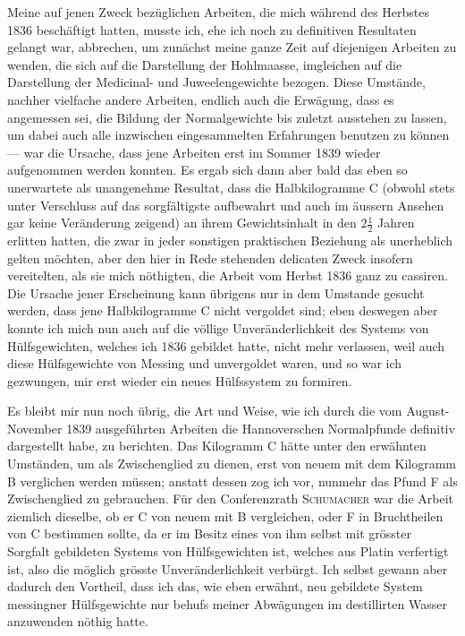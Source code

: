 Meine auf jenen Zweck bezüglichen Arbeiten, die mich während des
Herbstes 1836 beschäftigt hatten, musste ich, ehe ich noch zu definitiven
Resultaten gelangt war, abbrechen, um zunächst meine ganze Zeit auf diejenigen
Arbeiten zu wenden, die sich auf die Darstellung der Hohlmaasse,
imgleichen auf die Darstellung der Medicinal- und Juweelengewichte bezogen.
Diese Umstände, nachher vielfache andere Arbeiten, endlich auch die Erwägung,
dass es angemessen sei, die Bildung der Normalgewichte bis zuletzt
ausstehen zu lassen, um dabei auch alle inzwischen eingesammelten Erfahrungen
benutzen zu können — war die Ursache, dass jene Arbeiten erst im Sommer
1839 wieder aufgenommen werden konnten. Es ergab sich dann aber bald
\clearpage{}
\noindent das eben so unerwartete als unangenehme Resultat, dass die Halbkilogramme
C (obwohl stets unter Verschluss auf das sorgfältigste aufbewahrt und auch
im äussern Ansehen gar keine Veränderung zeigend) an ihrem Gewichtsinhalt
 in den \(2\frac{1}{2}\) Jahren erlitten hatten, die zwar in jeder sonstigen
praktischen Beziehung als unerheblich gelten möchten, aber den hier
in Rede stehenden delicaten Zweck insofern vereitelten, als sie mich nöthigten,
die Arbeit vom Herbst 1836 ganz zu cassiren. Die Ursache jener Erscheinung
kann übrigens nur in dem Umstande gesucht werden, dass jene
Halbkilogramme C nicht vergoldet sind; eben deswegen aber konnte ich mich
nun auch auf die völlige Unveränderlichkeit des Systems von Hülfsgewichten,
welches ich 1836 gebildet hatte, nicht mehr verlassen, weil auch diese Hülfsgewichte
von Messing und unvergoldet waren, und so war ich gezwungen, mir
erst wieder ein neues Hülfssystem zu formiren.

Es bleibt mir nun noch übrig, die Art und Weise, wie ich durch die
vom August-November 1839 ausgeführten Arbeiten die Hannoverschen Normalpfunde
definitiv dargestellt habe, zu berichten. Das Kilogramm C hätte unter
den erwähnten Umständen, um als Zwischenglied zu dienen, erst von neuem
mit dem Kilogramm B verglichen werden müssen; anstatt dessen zog ich vor,
nunmehr das Pfund F als Zwischenglied zu gebrauchen. Für den Conferenzrath
\textsc{Schumacher} war die Arbeit ziemlich dieselbe, ob er C von neuem mit
B vergleichen, oder F in Bruchtheilen von C bestimmen sollte, da er im Besitz
eines von ihm selbst mit grösster Sorgfalt gebildeten Systems von Hülfsgewichten
ist, welches aus Platin verfertigt ist, also die möglich grösste Unveränderlichkeit
verbürgt. Ich selbst gewann aber dadurch den Vortheil, dass
ich das, wie eben erwähnt, neu gebildete System messingner Hülfsgewichte
nur behufs meiner Abwägungen im destillirten Wasser anzuwenden nöthig
hatte.

